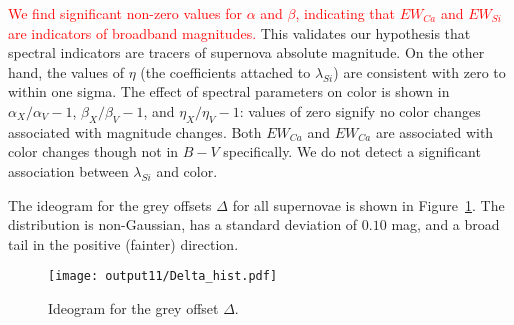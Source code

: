 \documentclass{aastex61}   	%
\begin{document}
\textcolor{red}{
We find significant non-zero values for $\alpha$ and $\beta$, indicating that $EW_{Ca}$ and $EW_{Si}$ are indicators of broadband
magnitudes.}
This validates our hypothesis that spectral indicators
are tracers of supernova absolute magnitude.  On the other hand, the values of $\eta$ (the coefficients attached to $\lambda_{Si}$) are consistent with zero
to  within one sigma.
The effect of spectral parameters on color is shown in $\alpha_X/\alpha_V-1$,  $\beta_X/\beta_V-1$, and  $\eta_X/\eta_V-1$:
values of zero signify no color changes associated with magnitude changes.
Both $EW_{Ca}$ and $EW_{Ca}$ are associated with color changes though not in $B-V$ specifically.
We do not detect a significant association between
$\lambda_{Si}$ and color.




The ideogram for the grey offsets $\Delta$ for all supernovae is shown in Figure~\ref{hist:fig}.  The distribution is non-Gaussian, 
has a standard deviation of
$0.10$
mag, and a broad tail in the positive (fainter) direction.
\begin{figure}[htbp] %
   \centering
   \texttt{[image: output11/Delta\_hist.pdf]} 
   \caption{Ideogram for the grey offset $\Delta$.
   \label{hist:fig}}
\end{figure}
\end{document}
